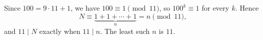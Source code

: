 Since $100=9\cdot11+1$, we have $100\equiv1\pmod{11}$, so $100^k\equiv1$ for every $k$. Hence
\[
N\equiv\underbrace{1+1+\cdots+1}_{n}=n\pmod{11},
\]
and $11\mid N$ exactly when $11\mid n$. The least such $n$ is $\boxed{11}$.
